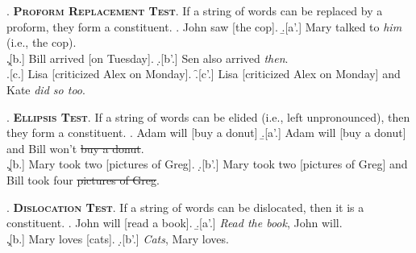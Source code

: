 \documentclass[11pt, oneside]{article}   	%
\begin{document}
\ex. {\bfseries \scshape Proform Replacement Test}. If a string of words can be replaced by a proform, they form a constituent.
	\a. John saw [the cop]. 
	\b.[a'.] Mary talked to {\em him} (i.e., the cop). \\
	\c.[b.] Bill arrived [on Tuesday]. 
	\d.[b'.] Sen also arrived {\em then}. \\
	\e.[c.] Lisa [criticized Alex on Monday].
	\f.[c'.] Lisa [criticized Alex on Monday] and Kate {\em did so too}. 

\ex. {\bfseries \scshape Ellipsis Test}. If a string of words can be elided (i.e., left unpronounced), then they form a constituent.
	\a. Adam will [buy a donut] 
	\b.[a'.] Adam will [buy a donut] and Bill won't \sout{buy a donut}. \\
	\c.[b.] Mary took two [pictures of Greg].
	\d.[b'.] Mary took two [pictures of Greg] and Bill took four \sout{pictures of Greg}.

\ex. {\bfseries \scshape Dislocation Test}. If a string of words can be dislocated, then it is a constituent.
	\a. John will [read a book]. 
	\b.[a'.] {\em Read the book}, John will. \\
	\c.[b.] Mary loves [cats]. 
	\d.[b'.] {\em Cats}, Mary loves.
\end{document}
